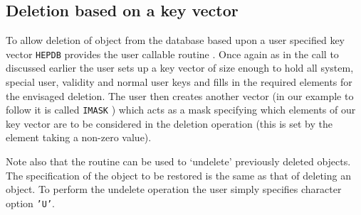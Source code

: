 \subsection{Deletion based on a key vector}
To allow deletion of object from the database based upon a user specified
key vector {\tt HEPDB} provides the user callable routine .
Once again as in the call to  discussed earlier the user
sets up a key vector of size enough to hold all system, special user,
validity and normal user keys and fills in the required elements for the
envisaged deletion. The user then creates another vector (in our example
to follow it is called {\tt IMASK} ) which acts as a mask specifying
which elements of our key vector are to be considered in the deletion
operation (this is set by the element taking a non-zero value).
\par
Note also that the routine  can be used to `undelete' previously
deleted objects. The specification of the object to be restored is the same as that
of deleting an object. To perform the undelete operation the user simply specifies
character option {\tt 'U'}.
%
%
%
